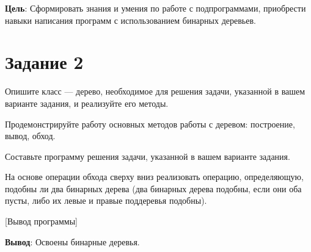 \documentclass{bsuir}
\begin{document}

\textbf{Цель}: Сформировать знания и умения по работе с подпрограммами,
приобрести навыки написания программ с использованием бинарных деревьев.

\section*{Задание 2}

Опишите класс --- дерево, необходимое для решения задачи, указанной в вашем
варианте задания, и реализуйте его методы.

Продемонстрируйте работу основных методов работы с деревом: построение, вывод,
обход.

Составьте программу решения задачи, указанной в вашем варианте задания.

На основе операции обхода сверху вниз реализовать операцию, определяющую,
подобны ли два бинарных дерева (два бинарных дерева подобны, если они оба пусты,
либо их левые и правые поддеревья подобны).


[Вывод программы]

\textbf{Вывод}: Освоены бинарные деревья.
\end{document}
